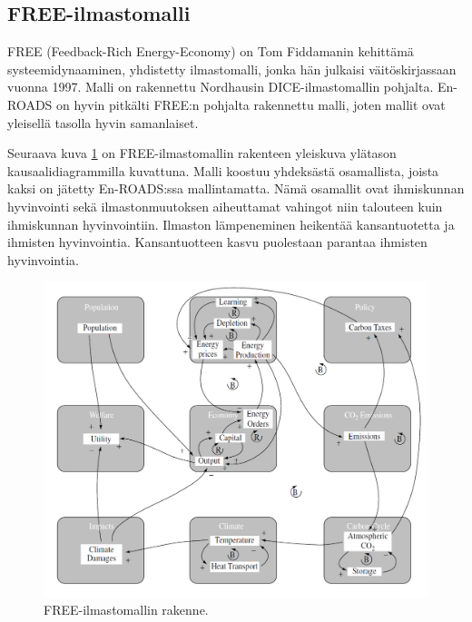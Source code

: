 \documentclass[finnish,12pt,a4paper,pdftex]{article}
\begin{document}
\begin{onehalfspacing}
\clearpage

\subsection{FREE-ilmastomalli \label{ilmasto:free}}

FREE (Feedback-Rich Energy-Economy) on Tom Fiddamanin kehittämä systeemidynaaminen, yhdistetty ilmastomalli, jonka hän julkaisi väitöskirjassaan vuonna 1997. Malli on rakennettu Nordhausin DICE-ilmastomallin \cite{Nordhaus1992} pohjalta. \cite{Fiddaman1997} En-ROADS on hyvin pitkälti FREE:n pohjalta rakennettu malli, joten mallit ovat yleisellä tasolla hyvin samanlaiset. 

Seuraava kuva \ref{ilmasto:muut:free} on FREE-ilmastomallin rakenteen yleiskuva ylätason kausaalidiagrammilla kuvattuna. Malli koostuu yhdeksästä osamallista, joista kaksi on jätetty En-ROADS:ssa mallintamatta. Nämä osamallit ovat ihmiskunnan hyvinvointi sekä ilmastonmuutoksen aiheuttamat vahingot niin talouteen kuin ihmiskunnan hyvinvointiin. Ilmaston lämpeneminen heikentää kansantuotetta ja ihmisten hyvinvointia. Kansantuotteen kasvu puolestaan parantaa ihmisten hyvinvointia. \cite{Fiddaman1997, Fiddaman2002}

\begin{figure}[H]
\centering \includegraphics[width=\textwidth]{free}
\caption{FREE-ilmastomallin rakenne. \cite{Fiddaman2002} \label{ilmasto:muut:free}}
\end{figure}


\end{onehalfspacing}
\end{document}
